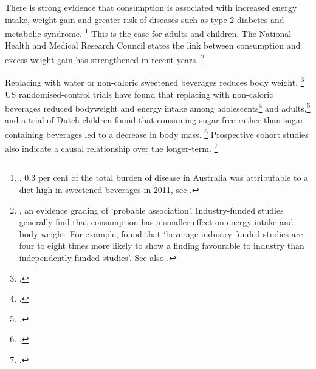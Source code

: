 \documentclass[embargoed]{grattan}
\begin{document}
There is strong evidence that \SSB{} consumption is associated with increased energy intake, weight gain and greater risk of diseases such as type 2 diabetes and metabolic syndrome.%
\footnote{\textcites{Johnson2009Dietarysugarsintake}{Woodward-Lopez2010whatextenthave}{Ludwig2001Relationconsumptionsugar}{Berkey2004Sugaraddedbeveragesadolescent}{Gill2006weightevidencesuggests}{TeMorenga2013Dietarysugarsbody}{Tam2006Softdrinkconsumption}{Basu2013Relationshipsoftdrink}{Dhingra2007Softdrinkconsumption}{Vartanian2007Effectssoftdrink}{Imamura2015Consumptionsugarsweetened}{Pan2013Changeswaterbeverage}{Malik2006Intakesugarsweetened}{Malik2010Sugarsweetenedbeverages}{Malik2010riskmetaanalysis}{Organization2016Reportcommissionending}{Organisation2015Sugarsintakeadults}{Agriculture2010DietaryGuidelinesAmericans}. 0.3 per cent of the total burden of disease in Australia was attributable to a diet high in sweetened beverages in 2011, see \textcite{Health2016AustralianBurdenDisease}.} This is the case for adults and children.
The National Health and Medical Research Council states the link between \SSB{} consumption and excess weight gain has strengthened in recent years.%
\footnote{\textcite[][67]{Health2013AustralianDietaryGuidelines}, an evidence grading of `probable association'.
Industry-funded studies generally find that \SSB{} consumption has a smaller effect on energy intake and body weight.
For example, \textcite{Vartanian2007Effectssoftdrink} found that `beverage industry-funded studies are four to eight times more likely to show a finding favourable to industry than independently-funded studies'.
See also \textcites{Bes-Rastrollo2013Financialconflictsinterest}{Lesser2007Relationshipfundingsource}.}

Replacing \SSBs{} with water or non-caloric sweetened beverages reduces body weight.%
\footcite{Malik2006Intakesugarsweetened} US randomised-control trials have found that replacing \SSBs{} with non-caloric beverages reduced bodyweight and energy intake among adolescents\footcite{Ebbeling2002Childhoodobesitypublic} and adults,\footcite{Chen2009Reductionconsumptionsugar} and a trial of Dutch children found that consuming sugar-free rather than sugar-containing beverages led to a decrease in body mass.%
\footcites{Ruyter2012trialsugarfree}{Malik2006Intakesugarsweetened} Prospective cohort studies also indicate a causal relationship over the longer-term.%
\footcites{Hu2013Resolvedthereis}{Malik2006Intakesugarsweetened}{TeMorenga2013Dietarysugarsbody}
\end{document}
